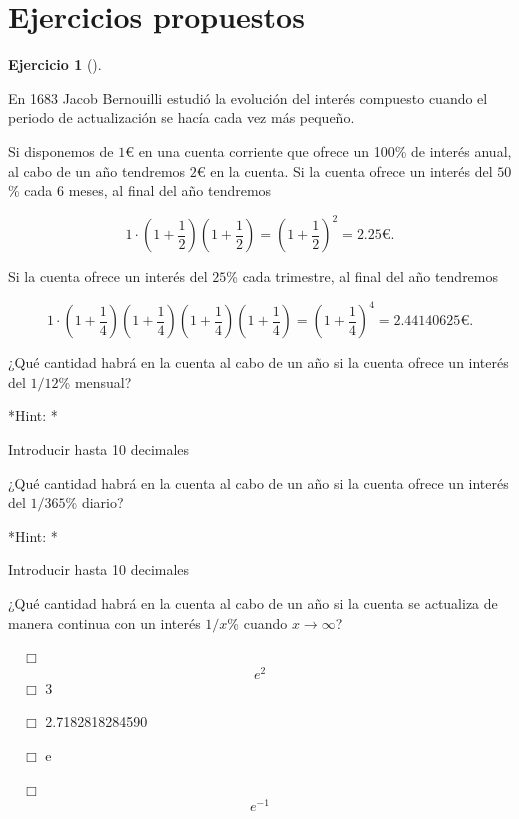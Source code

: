\documentclass[
  a4paper,
]{scrreport}
\theoremstyle{definition}
\newtheorem{exercise}{Ejercicio}[chapter]
\theoremstyle{remark}
\begin{document}
\hypertarget{ejercicios-propuestos-2}{%
\section{Ejercicios propuestos}\label{ejercicios-propuestos-2}}

\begin{exercise}[]\protect\hypertarget{exr-interes-compuesto}{}\label{exr-interes-compuesto}

En 1683 Jacob Bernouilli estudió la evolución del interés compuesto
cuando el periodo de actualización se hacía cada vez más pequeño.

Si disponemos de \(1\)€ en una cuenta corriente que ofrece un 100\% de
interés anual, al cabo de un año tendremos \(2\)€ en la cuenta. Si la
cuenta ofrece un interés del \(50\)\% cada 6 meses, al final del año
tendremos

\[
1\cdot\left(1+\frac{1}{2}\right)\left(1+\frac{1}{2}\right)= \left(1+\frac{1}{2}\right)^2 = 2.25\mbox{€}.
\]

Si la cuenta ofrece un interés del \(25\)\% cada trimestre, al final del
año tendremos

\[
1\cdot\left(1+\frac{1}{4}\right)\left(1+\frac{1}{4}\right)\left(1+\frac{1}{4}\right)\left(1+\frac{1}{4}\right)= \left(1+\frac{1}{4}\right)^4 = 2.44140625\mbox{€}.
\]

¿Qué cantidad habrá en la cuenta al cabo de un año si la cuenta ofrece
un interés del \(1/12\)\% mensual?

\vspace{18pt}*Hint: *

Introducir hasta 10 decimales

¿Qué cantidad habrá en la cuenta al cabo de un año si la cuenta ofrece
un interés del \(1/365\)\% diario?

\vspace{18pt}*Hint: *

Introducir hasta 10 decimales

¿Qué cantidad habrá en la cuenta al cabo de un año si la cuenta se
actualiza de manera continua con un interés \(1/x\)\% cuando
\(x\to\infty\)?

${\quad\Box}$ $$e^2$$
${\quad\Box}$ 3

${\quad\Box}$ 2.7182818284590

${\quad\Box}$ e

${\quad\Box}$ $$e^{-1}$$

\end{exercise}
\end{document}
